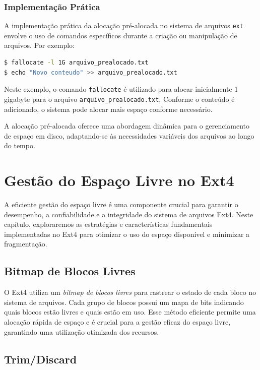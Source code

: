 \documentclass[
	12pt,				%
	openright,			%
	oneside,			%
	a4paper,			%
	chapter=TITLE,		%
	english,			%
	french,				%
	spanish,			%
	brazil				%
	]{abntex2}
\theoremstyle{definition}
\begin{document}
\subsection{Implementação Prática}
A implementação prática da alocação pré-alocada no sistema de arquivos \texttt{ext} envolve o uso de comandos específicos durante a criação ou manipulação de arquivos. Por exemplo:

\begin{lstlisting}[language=bash, caption={Exemplo de Alocação Pré-Alocada}]
$ fallocate -l 1G arquivo_prealocado.txt  
$ echo "Novo conteudo" >> arquivo_prealocado.txt   
\end{lstlisting}

Neste exemplo, o comando \texttt{fallocate} é utilizado para alocar inicialmente 1 gigabyte para o arquivo \texttt{arquivo\_prealocado.txt}. Conforme o conteúdo é adicionado, o sistema pode alocar mais espaço conforme necessário.

A alocação pré-alocada oferece uma abordagem dinâmica para o gerenciamento de espaço em disco, adaptando-se às necessidades variáveis dos arquivos ao longo do tempo.

\chapter{Gestão do Espaço Livre no Ext4}

A eficiente gestão do espaço livre é uma componente crucial para garantir o desempenho, a confiabilidade e a integridade do sistema de arquivos Ext4. Neste capítulo, exploraremos as estratégias e características fundamentais implementadas no Ext4 para otimizar o uso do espaço disponível e minimizar a fragmentação.

\section{Bitmap de Blocos Livres}

O Ext4 utiliza um \textit{bitmap de blocos livres} para rastrear o estado de cada bloco no sistema de arquivos. Cada grupo de blocos possui um mapa de bits indicando quais blocos estão livres e quais estão em uso. Esse método eficiente permite uma alocação rápida de espaço e é crucial para a gestão eficaz do espaço livre, garantindo uma utilização otimizada dos recursos.

\section{Trim/Discard}
\end{document}
